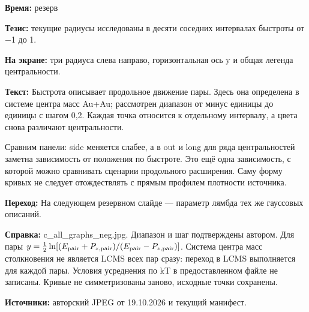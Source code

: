 \textbf{Время:} резерв

\textbf{Тезис:} текущие радиусы исследованы в десяти соседних интервалах быстроты от −1 до 1.

\textbf{На экране:} три радиуса слева направо, горизонтальная ось y и общая легенда центральности.

\textbf{Текст:} Быстрота описывает продольное движение пары. Здесь она определена в системе центра масс Au+Au; рассмотрен диапазон от минус единицы до единицы с шагом 0,2. Каждая точка относится к отдельному интервалу, а цвета снова различают центральности.

Сравним панели: side меняется слабее, а в out и long для ряда центральностей заметна зависимость от положения по быстроте. Это ещё одна зависимость, с которой можно сравнивать сценарии продольного расширения. Саму форму кривых не следует отождествлять с прямым профилем плотности источника.

\textbf{Переход:} На следующем резервном слайде — параметр лямбда тех же гауссовых описаний.

\textbf{Справка:} c\_all\_graphs\_neg.jpg. Диапазон и шаг подтверждены автором. Для пары \(y=\tfrac12\ln[(E_{\rm pair}+P_{z,\rm pair})/(E_{\rm pair}-P_{z,\rm pair})]\). Система центра масс столкновения не является LCMS всех пар сразу: переход в LCMS выполняется для каждой пары. Условия усреднения по kT в предоставленном файле не записаны. Кривые не симметризованы заново, исходные точки сохранены.

\textbf{Источники:} авторский JPEG от 19.10.2026 и текущий манифест.
